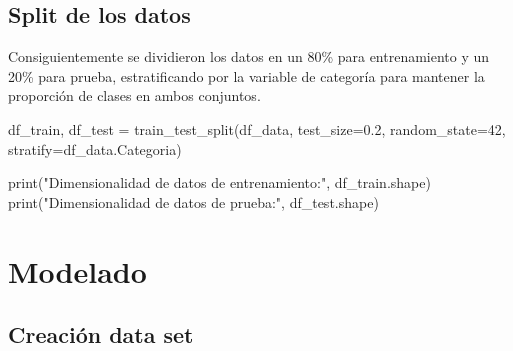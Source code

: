 \documentclass[
  10pt,
]{article}
\newenvironment{Shaded}{\begin{snugshade}}{\end{snugshade}}
\newcommand{\BuiltInTok}[1]{\textcolor[rgb]{0.00,0.23,0.31}{#1}}
\newcommand{\DecValTok}[1]{\textcolor[rgb]{0.68,0.00,0.00}{#1}}
\newcommand{\FloatTok}[1]{\textcolor[rgb]{0.68,0.00,0.00}{#1}}
\newcommand{\NormalTok}[1]{\textcolor[rgb]{0.00,0.23,0.31}{#1}}
\newcommand{\OperatorTok}[1]{\textcolor[rgb]{0.37,0.37,0.37}{#1}}
\newcommand{\StringTok}[1]{\textcolor[rgb]{0.13,0.47,0.30}{#1}}
\begin{document}
\subsection{Split de los datos}\label{split-de-los-datos}

Consiguientemente se dividieron los datos en un 80\% para entrenamiento
y un 20\% para prueba, estratificando por la variable de categoría para
mantener la proporción de clases en ambos conjuntos.

\begin{Shaded}
\begin{Highlighting}[]

\NormalTok{df\_train, df\_test }\OperatorTok{=}\NormalTok{ train\_test\_split(df\_data, }
\NormalTok{    test\_size}\OperatorTok{=}\FloatTok{0.2}\NormalTok{, random\_state}\OperatorTok{=}\DecValTok{42}\NormalTok{, stratify}\OperatorTok{=}\NormalTok{df\_data.Categoria)}

\BuiltInTok{print}\NormalTok{(}\StringTok{"Dimensionalidad de datos de entrenamiento:"}\NormalTok{, df\_train.shape)}
\BuiltInTok{print}\NormalTok{(}\StringTok{"Dimensionalidad de datos de prueba:"}\NormalTok{, df\_test.shape)}
\end{Highlighting}
\end{Shaded}

\section{Modelado}\label{modelado}

\subsection{Creación data set}\label{creaciuxf3n-data-set}
\end{document}
